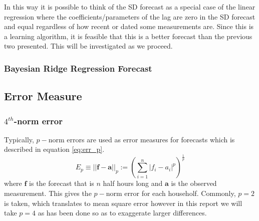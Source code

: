 \documentclass[a4paper]{article}
\begin{document}
In this way it is possible to think of the SD forecast as a special case of the linear regression where the coefficients/parameters of the lag are zero in the SD forecast and equal regardless of how recent or dated some measurements are. Since this is a learning algorithm, it is feasible that this is a better forecast than the previous two presented. This will be investigated as we proceed.

\subsubsection{Bayesian Ridge Regression Forecast} \label{subsubsec:BR}


\subsection{Error Measure}
\label{subsec:ErrMethods}

\subsubsection{$4^{th}$-norm error}
\label{subsubsec:4-norm} Typically, $p-$norm errors are used as error measures for forecasts which is described in equation \ref{eq:err_p}.
\begin{equation}\label{eq:err_p}
E_p \equiv ||\boldsymbol{f} - \boldsymbol{a}||_p := \left( \sum_{i=1}^{n} |f_i - a_i |^p\right)^{\frac{1}{p}}
\end{equation}
where $\boldsymbol{f}$ is the forecast that is $n$ half hours long and $\boldsymbol{a}$ is the observed measurement. This gives the $p-$norm error for each householf. Commonly, $p=2$ is taken, which translates to mean square error however in this report we will take $p=4$ as has been done \citet{dan14}  so as to exaggerate larger differences.
\end{document}
